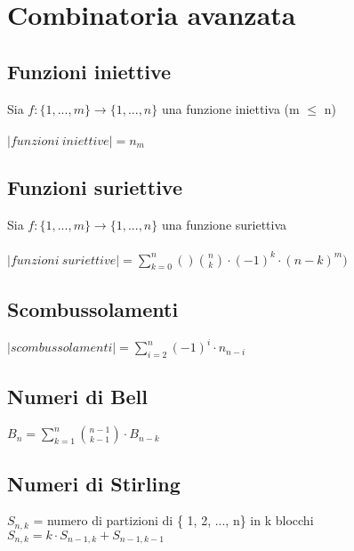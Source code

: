 \section{Combinatoria avanzata}
\subsection{Funzioni iniettive}
Sia $f:\{ 1, ..., m\} \rightarrow \{ 1, ..., n\}$ una funzione iniettiva (m $\leq$ n) \\ \\
$|funzioni \ iniettive| = n_{m}$
\subsection{Funzioni suriettive}
Sia $f:\{ 1, ..., m\} \rightarrow \{ 1, ..., n\}$ una funzione suriettiva \\ \\
$|funzioni \ suriettive| = 	 \displaystyle \sum_{k = 0}^{n} ()\binom{n}{k} \cdot (-1)^k \cdot (n - k)^m)$
\subsection{Scombussolamenti}
$|scombussolamenti| = \displaystyle \sum_{i = 2}^{n} (-1)^i \cdot n_{n - i}$
\subsection{Numeri di Bell}
$B_n = \displaystyle \sum_{k = 1}^{n} \binom{n - 1}{k - 1} \cdot B_{n - k}$
\subsection{Numeri di Stirling}
$S_{n, k}$ = numero di partizioni di \{ 1, 2, ..., n\} in k blocchi \\
$S_{n, k} = k \cdot S_{n - 1, k} + S_{n - 1, k - 1}$
